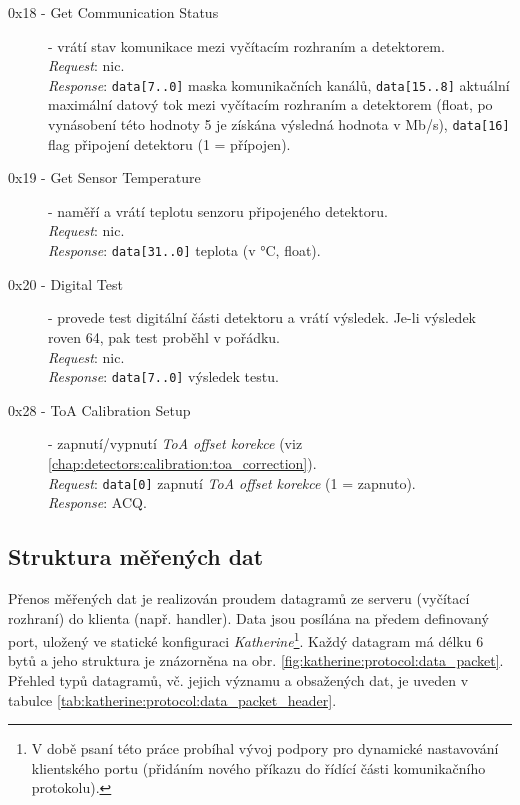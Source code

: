 \begin{description}
    \item[0x18 - Get Communication Status] - vrátí stav komunikace mezi vyčítacím rozhraním a detektorem.
    \\\textit{Request}: nic.
    \\\textit{Response}: \texttt{data[7..0]} maska komunikačních kanálů, \texttt{data[15..8]} aktuální maximální datový tok mezi vyčítacím rozhraním a detektorem (float, po vynásobení této hodnoty 5 je získána výsledná hodnota v Mb/s), \texttt{data[16]} flag připojení detektoru (1 = přípojen).

    \item[0x19 - Get Sensor Temperature] - naměří a vrátí teplotu senzoru připojeného detektoru.
    \\\textit{Request}: nic.
    \\\textit{Response}: \texttt{data[31..0]} teplota (v °C, float).

    \item[0x20 - Digital Test] - provede test digitální části detektoru a vrátí výsledek. Je-li výsledek roven 64, pak test proběhl v pořádku.
    \\\textit{Request}: nic.
    \\\textit{Response}: \texttt{data[7..0]} výsledek testu.

    \item[0x28 - ToA Calibration Setup] - zapnutí/vypnutí \textit{ToA offset korekce} (viz \ref{chap:detectors:calibration:toa_correction}).
    \\\textit{Request}: \texttt{data[0]} zapnutí \textit{ToA offset korekce} (1 = zapnuto).
    \\\textit{Response}: ACQ.

\end{description}

\subsection{Struktura měřených dat}\label{chap:katherine:protocol:measure_data_structure}
Přenos měřených dat je realizován proudem datagramů ze serveru (vyčítací rozhraní) do klienta (např. handler). Data jsou posílána na předem definovaný port, uložený ve statické konfiguraci \textit{Katherine}\footnote{V době psaní této práce probíhal vývoj podpory pro dynamické nastavování klientského portu (přidáním nového příkazu do řídící části komunikačního protokolu).}. Každý datagram má délku 6 bytů a jeho struktura je znázorněna na obr. \ref{fig:katherine:protocol:data_packet}. Přehled typů datagramů, vč. jejich významu a obsažených dat, je uveden v tabulce \ref{tab:katherine:protocol:data_packet_header}.

